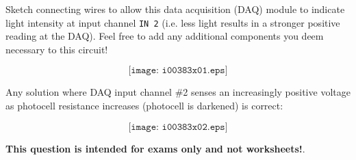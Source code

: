 

Sketch connecting wires to allow this data acquisition (DAQ) module to indicate light intensity at input channel {\tt IN 2} (i.e. less light results in a stronger positive reading at the DAQ).  Feel free to add any additional components you deem necessary to this circuit!

\vskip 50pt

$$\texttt{[image: i00383x01.eps]}$$







Any solution where DAQ input channel \#2 senses an increasingly positive voltage as photocell resistance increases (photocell is darkened) is correct:

$$\texttt{[image: i00383x02.eps]}$$







{\bf This question is intended for exams only and not worksheets!}.



